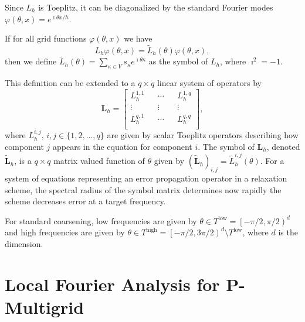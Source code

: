 \documentclass[review]{siamart190516}
\begin{document}
Since $L_h$ is Toeplitz, it can be diagonalized by the standard Fourier modes $\varphi \left( \theta, x \right) = e^{\imath \theta x / h}$.

\begin{definition}[Symbol of $L_h$]\label{def:symbol}
If for all grid functions $\varphi \left( \theta, x \right)$ we have
\begin{equation}
L_h \varphi \left( \theta, x \right) = \tilde{L}_h \left( \theta \right) \varphi \left( \theta, x \right),
\end{equation}
then we define $\tilde{L}_h \left( \theta \right) = \sum_{\kappa \in V} s_\kappa e^{\imath \theta \kappa}$ as the symbol of $L_h$, where $\imath^2 = -1$.
\end{definition}

This definition can be extended to a $q \times q$ linear system of operators by
\begin{equation}
\mathbf{L}_h =
\begin{bmatrix}
    L_h^{1, 1} && \cdots && L_h^{1, q}        \\
    \vdots               && \vdots && \vdots  \\
    L_h^{q, 1} && \cdots && L_h^{q, q}        \\
\end{bmatrix},
\end{equation}
where $L_h^{i, j}$, $i, j \in \lbrace 1, 2, \dots, q \rbrace$ are given by scalar Toeplitz operators describing how component $j$ appears in the equation for component $i$.
The symbol of $\mathbf{L}_h$, denoted $\tilde{\mathbf{L}}_h$, is a $q \times q$ matrix valued function of $\theta$ given by $\left( \tilde{\mathbf{L}}_h \right)_{i, j} = \tilde{L}_h^{i, j} \left( \theta \right)$.
For a system of equations representing an error propagation operator in a relaxation scheme, the spectral radius of the symbol matrix determines now rapidly the scheme decreases error at a target frequency.

For standard coarsening, low frequencies are given by $\theta \in T^{\text{low}} = \left[ - \pi / 2, \pi / 2 \right)^d$ and high frequencies are given by $\theta \in T^{\text{high}} = \left[ - \pi / 2, 3 \pi / 2 \right)^d \setminus T^{\text{low}}$, where $d$ is the dimension.

\section{Local Fourier Analysis for P-Multigrid}\label{sec:lfa}
\end{document}
